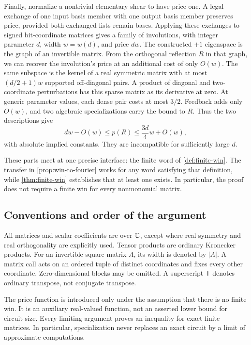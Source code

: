 \begin{enumerate}[leftmargin=*,label=\textup{(\roman*)}]
Finally, normalize a nontrivial elementary shear to have price one.
A legal exchange of one input basis member with one output basis member
preserves price, provided both exchanged lists remain bases. Applying
these exchanges to signed bit-coordinate matrices gives a family of
involutions, with integer parameter $d$, width $w=w(d)$, and price $dw$.
The constructed $+1$ eigenspace is the graph of an invertible matrix.
From the orthogonal reflection $R$ in that graph, we can recover the
involution's price at an additional cost of only $O(w)$.
The same subspace is the kernel of a real symmetric matrix with at most
$(d/2+1)w$ supported off-diagonal pairs. A product of diagonal and
two-coordinate perturbations has this sparse matrix as its derivative
at zero. At generic parameter values, each dense pair costs at most
$3/2$. Feedback adds only $O(w)$, and two algebraic specializations
carry the bound to $R$. Thus the two descriptions give
\[
 dw-O(w)\leq p(R)\leq \frac{3d}{4}w+O(w),
\]
with absolute implied constants. They are incompatible for sufficiently
large $d$.
\end{enumerate}

These parts meet at one precise interface: the finite word of
\cref{def:finite-win}. The transfer in \cref{prop:win-to-fourier} works
for any word satisfying that definition, while
\cref{thm:finite-win} establishes that at least one exists. In particular,
the proof does not require a finite win for every nonmonomial matrix.

\subsection{Conventions and order of the argument}

All matrices and scalar coefficients are over $\mathbb C$, except where real
symmetry and real orthogonality are explicitly used. Tensor products are
ordinary Kronecker products. For an invertible square
matrix $A$, its width is denoted by $|A|$. A matrix call acts on an ordered
tuple of distinct coordinates and fixes every other coordinate.
Zero-dimensional blocks may be omitted. A superscript $\mathsf T$
denotes ordinary transpose, not conjugate transpose.

The price function is introduced only under the assumption that there
is no finite win. It is an auxiliary real-valued function, not an
asserted lower bound for circuit size. Every limiting argument proves
an inequality for exact finite matrices. In particular, specialization
never replaces an exact circuit by a limit of approximate computations.

